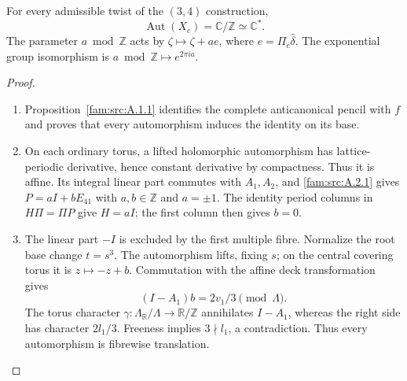 \begin{theorem}\hypertarget{tag-01QF}{}\label{fam:src:B.4.1}\label{fam:st:B.4.1}\hypertarget{tag-02YQ}{}\label{night:P5.5}\label{stmt:P5.5}

For every admissible twist of the $(3,4)$ construction,
\[
 \operatorname{Aut}(X_c)=\mathbb C/\mathbb Z\simeq\mathbb C^*.
\]
The parameter $a\bmod\mathbb Z$ acts by $\zeta\mapsto\zeta+ae$,
where $e=\Pi_c\widehat\delta$. The exponential group isomorphism
is $a\bmod\mathbb Z\mapsto e^{2\pi ia}$.
\end{theorem}
\begin{proof}
\begin{enumerate}[label=\arabic*.,leftmargin=*]
\item Proposition~\ref{fam:src:A.1.1} identifies the complete
anticanonical pencil with $f$ and proves that every automorphism
induces the identity on its base.

\item On each ordinary torus, a lifted holomorphic automorphism
has lattice-periodic derivative, hence constant derivative by
compactness. Thus it is affine. Its integral linear part commutes
with $A_1,A_2$, and \cref{fam:src:A.2.1} gives
$P=aI+bE_{41}$ with $a,b\in\mathbb Z$ and $a=\pm1$.
The identity period columns in $H\Pi=\Pi P$ give $H=aI$;
the first column then gives $b=0$.

\item The linear part $-I$ is excluded by the first multiple fibre.  Normalize
the root base change $t=s^3$.  The automorphism lifts, fixing $s$; on the
central covering torus it is $z\mapsto-z+b$.  Commutation with the affine
deck transformation gives
\[
 (I-A_1)b=2v_1/3\pmod\Lambda.
\]
The torus character $\gamma:\Lambda_{\mathbb R}/\Lambda\to\mathbb R/\mathbb Z$
annihilates $I-A_1$, whereas the right side has character $2l_1/3$.
Freeness implies $3\nmid l_1$, a contradiction.  Thus every automorphism
is fibrewise translation.


\end{enumerate}
\end{proof}
